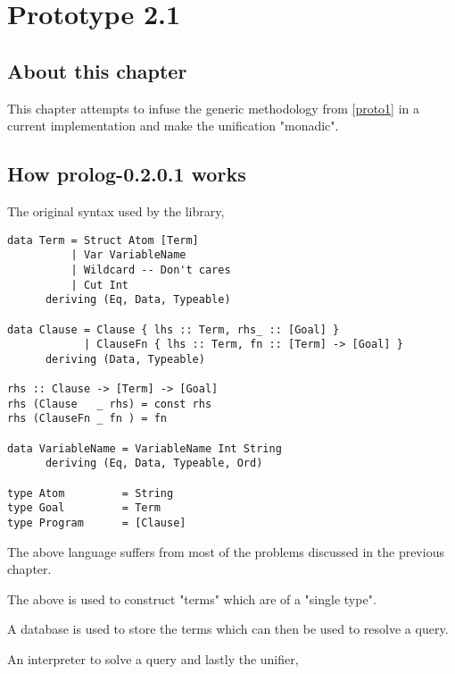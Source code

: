 \documentclass[proposal.tex]{subfiles}
\begin{document}
\section{Prototype 2.1}{\label{proto2.1}}

\subsection{About this chapter}
This chapter attempts to infuse the generic methodology from \ref{proto1} in a current  implementation \cite{prolog-lib}
and make the unification "monadic".

\subsection{How prolog-0.2.0.1 works}

The original syntax used by the library,

\begin{verbatim}
data Term = Struct Atom [Term]
          | Var VariableName
          | Wildcard -- Don't cares 
          | Cut Int
      deriving (Eq, Data, Typeable)

data Clause = Clause { lhs :: Term, rhs_ :: [Goal] }
            | ClauseFn { lhs :: Term, fn :: [Term] -> [Goal] }
      deriving (Data, Typeable)

rhs :: Clause -> [Term] -> [Goal]      
rhs (Clause   _ rhs) = const rhs
rhs (ClauseFn _ fn ) = fn

data VariableName = VariableName Int String
      deriving (Eq, Data, Typeable, Ord)

type Atom         = String
type Goal         = Term
type Program      = [Clause]
\end{verbatim} 

The above language suffers from most of the problems discussed in the previous chapter.

The above is used to construct  "terms" which are of a "single type".   

A database is used to store the terms which can then be used to resolve a query.

An interpreter to solve a query and lastly the unifier,
\end{document}
